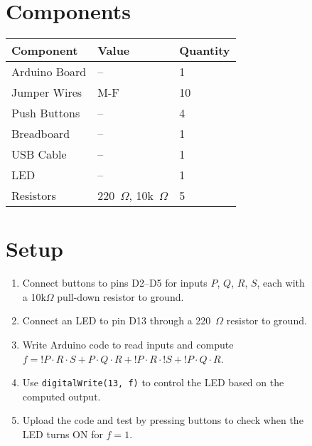 \documentclass[12pt,a4paper]{article}
\begin{document}
\begin{figure}[H]
\begin{minipage}[t]{0.48\textwidth}
    \vspace{0.3cm}
  \end{minipage}\hfill
  \begin{minipage}[t]{0.48\textwidth}
    \section*{Components}
    \small
    \renewcommand{\arraystretch}{1.3}
    \begin{tabular}{|l|l|l|}
      \hline
      \textbf{Component} & \textbf{Value} & \textbf{Quantity} \\ \hline
      Arduino Board & -- & 1 \\ \hline
      Jumper Wires & M-F & 10 \\ \hline
      Push Buttons & -- & 4 \\ \hline
      Breadboard & -- & 1 \\ \hline
      USB Cable & -- & 1 \\ \hline
      LED & -- & 1 \\ \hline
      Resistors & 220~$\Omega$, 10k~$\Omega$ & 5 \\ \hline
    \end{tabular}

    \vspace{0.8cm}

    \section*{Setup}
    \small
    \begin{enumerate}
      \item Connect buttons to pins D2–D5 for inputs $P$, $Q$, $R$, $S$, each with a 10k$\Omega$ pull-down resistor to ground.
      \item Connect an LED to pin D13 through a 220~$\Omega$ resistor to ground.
      \item Write Arduino code to read inputs and compute $f = {!}P \cdot R \cdot S + P \cdot Q \cdot R + {!}P \cdot R \cdot {!}S + {!}P \cdot Q \cdot R$.
      \item Use \texttt{digitalWrite(13, f)} to control the LED based on the computed output.
      \item Upload the code and test by pressing buttons to check when the LED turns ON for $f = 1$.
    \end{enumerate}
  \end{minipage}
\end{figure}
\end{document}
